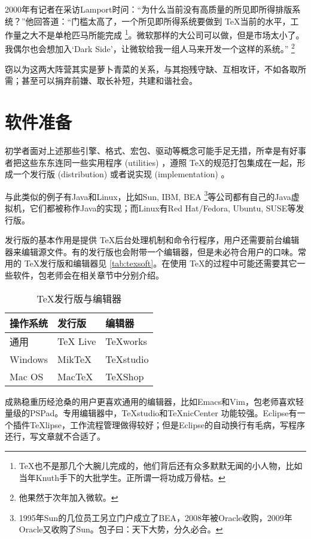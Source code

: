 2000年有记者在采访Lamport\indexLamport{}时问：“为什么当前没有高质量的所见即所得排版系统？”他回答道：“门槛太高了，一个所见即所得系统要做到 \TeX 当前的水平，工作量之大不是单枪匹马所能完成 \footnote{\TeX 也不是那几个大腕儿完成的，他们背后还有众多默默无闻的小人物，比如当年Knuth手下的大批学生。正所谓一将功成万骨枯。}。微软那样的大公司可以做，但是市场太小了。我偶尔也会想加入‘Dark Side’，让微软给我一组人马来开发一个这样的系统。” \footnote{他果然于次年加入微软。}

窃以为这两大阵营其实是萝卜青菜的关系，与其抱残守缺、互相攻讦，不如各取所需；甚至可以捐弃前嫌、取长补短，共建和谐社会。

\section{软件准备}

初学者面对上述那些引擎、格式、宏包、驱动等概念可能手足无措，所幸是有好事者把这些东东连同一些实用程序 (utilities) ，遵照 \TeX 的规范打包集成在一起，形成一个发行版 (distribution) 或者说实现 (implementation) 。

与此类似的例子有Java和Linux，比如Sun, IBM, BEA \footnote{1995年Sun的几位员工另立门户成立了BEA，2008年被Oracle收购，2009年Oracle又收购了Sun。包子曰：天下大势，分久必合。}等公司都有自己的Java虚拟机，它们都被称作Java的实现；而Linux有Red Hat/Fedora, Ubuntu, SUSE等发行版。

发行版的基本作用是提供 \TeX 后台处理机制和命令行程序，用户还需要前台编辑器来编辑源文件。有的发行版也会附带一个编辑器，但是未必符合用户的口味。常用的 \TeX 发行版和编辑器见 \autoref{tab:texsoft}。在使用 \TeX 的过程中可能还需要其它一些软件，包老师会在相关章节中分别介绍。

\begin{table}[htbp]
\caption{\TeX 发行版与编辑器}
\label{tab:texsoft}
\centering
\begin{tabular}{lll}
   \toprule
    操作系统 & 发行版 & 编辑器 \\
   \midrule
    通用        & TeX Live  & TeXworks \\
    Windows     & MikTeX    & TeXstudio \\
    Mac OS      & MacTeX    & TeXShop \\

   \bottomrule
\end{tabular}
\end{table}

成熟稳重历经沧桑的用户更喜欢通用的编辑器，比如Emacs和Vim，包老师喜欢轻量级的PSPad。专用编辑器中，TeXstudio和TeXnicCenter 功能较强。Eclipse有一个插件TeXlipse，工作流程管理做得较好；但是Eclipse的自动换行有毛病，写程序还行，写文章就不合适了。

